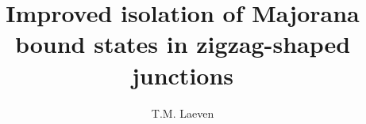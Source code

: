 \documentclass{tudelft-report}
\begin{document}
\frontmatter

\title[tudelft-white]{Improved isolation of Majorana bound states in zigzag-shaped junctions}
\subtitle[tudelft-black]{
}
\author[tudelft-white]{T.M. Laeven}

\makecover






\tableofcontents

\mainmatter






\appendix

%


\end{document}

